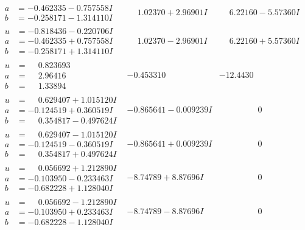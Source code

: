 \documentclass[1p]{elsarticle_modified}
\theoremstyle{definition}
\begin{document}
$$\begin{array}{c|c|c}
\begin{aligned}
a &= -0.462335 - 0.757558 I \\
b &= -0.258171 - 1.314110 I\end{aligned}
 & \phantom{-}1.02370 + 2.96901 I & \phantom{-}6.22160 - 5.57360 I \\ \hline\begin{aligned}
u &= -0.818436 - 0.220706 I \\
a &= -0.462335 + 0.757558 I \\
b &= -0.258171 + 1.314110 I\end{aligned}
 & \phantom{-}1.02370 - 2.96901 I & \phantom{-}6.22160 + 5.57360 I \\ \hline\begin{aligned}
u &= \phantom{-}0.823693\phantom{ +0.000000I} \\
a &= \phantom{-}2.96416\phantom{ +0.000000I} \\
b &= \phantom{-}1.33894\phantom{ +0.000000I}\end{aligned}
 & -0.453310\phantom{ +0.000000I} & -12.4430\phantom{ +0.000000I} \\ \hline\begin{aligned}
u &= \phantom{-}0.629407 + 1.015120 I \\
a &= -0.124519 + 0.360519 I \\
b &= \phantom{-}0.354817 - 0.497624 I\end{aligned}
 & -0.865641 - 0.009239 I & \phantom{-0.000000 } 0 \\ \hline\begin{aligned}
u &= \phantom{-}0.629407 - 1.015120 I \\
a &= -0.124519 - 0.360519 I \\
b &= \phantom{-}0.354817 + 0.497624 I\end{aligned}
 & -0.865641 + 0.009239 I & \phantom{-0.000000 } 0 \\ \hline\begin{aligned}
u &= \phantom{-}0.056692 + 1.212890 I \\
a &= -0.103950 - 0.233463 I \\
b &= -0.682228 + 1.128040 I\end{aligned}
 & -8.74789 + 8.87696 I & \phantom{-0.000000 } 0 \\ \hline\begin{aligned}
u &= \phantom{-}0.056692 - 1.212890 I \\
a &= -0.103950 + 0.233463 I \\
b &= -0.682228 - 1.128040 I\end{aligned}
 & -8.74789 - 8.87696 I & \phantom{-0.000000 } 0 \\ \hline\begin{aligned}

\end{aligned}
\end{array}$$
\end{document}
